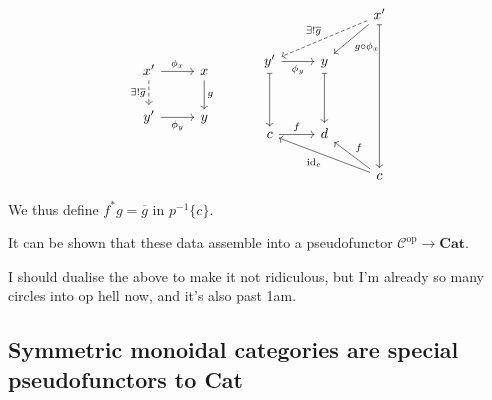\documentclass{MetricNotes2023}
\def\id{\ensuremath\text{id}}
\begin{document}
\[\begin{tikzcd}
x' \arrow[r, "\phi_x"] \arrow[d, swap, dashrightarrow, "\exists!\overline g"]  & x \arrow[d, "g"]  \\
y' \arrow[r, swap, "\phi_y"]  & y
\end{tikzcd}\quad\quad\quad \begin{tikzcd}
 & & x' \arrow[dddd, mapsto, ""] \arrow[dll, dashrightarrow, swap, "\exists !\overline g"] \arrow[dl, "g \circ \phi_x"] \\
y' \arrow[r, swap, "\phi_y"] \arrow[dd, mapsto, swap, ""] & y \arrow[dd, mapsto, swap, ""]  & \\
& & \\
c \arrow[r, "f"] & d  & \\
 & & c \arrow[llu, "\id_c"] \arrow[lu, swap, "f"] 
\end{tikzcd}\]

We thus define \(f^*g=\overline{g}\) in \(p^{-1}\{c\}\). 

It can be shown that these data assemble into a pseudofunctor \(\mathcal{C}^{\text{op}}\to \textbf{Cat}\).

I should dualise the above to make it not ridiculous, but I'm already so many circles into op hell now, and it's also past 1am. 

\subsection{Symmetric monoidal categories are special pseudofunctors to \textbf{Cat}}
\end{document}
